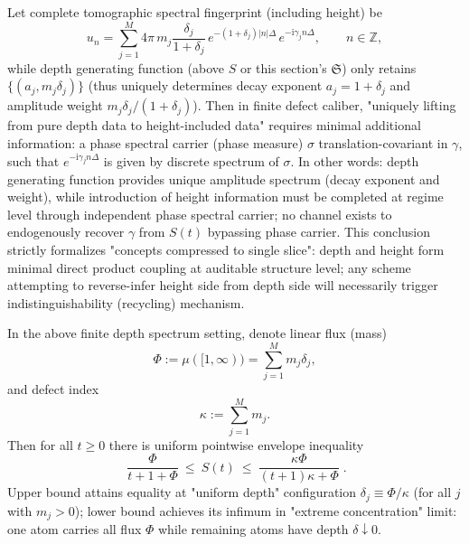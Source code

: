 \begin{proposition}\label{prop:xi-depth-height-minimal-coupling}
Let complete tomographic spectral fingerprint (including height) be
\[
u_n=\sum_{j=1}^{M}4\pi\,m_j\frac{\delta_j}{1+\delta_j}\,e^{-(1+\delta_j)|n|\Delta}\,e^{-\mathrm{i}\gamma_j n\Delta},
\qquad n\in\mathbb{Z},
\]
while depth generating function (above \(S\) or this section's \(\mathfrak{S}\)) only retains \(\{(a_j,m_j\delta_j)\}\) (thus uniquely determines decay exponent \(a_j=1+\delta_j\) and amplitude weight \(m_j\delta_j/(1+\delta_j)\)).
Then in finite defect caliber, "uniquely lifting from pure depth data to height-included data" requires minimal additional information: a phase spectral carrier (phase measure) \(\sigma\) translation-covariant in \(\gamma\), such that \(e^{-\mathrm{i}\gamma_j n\Delta}\) is given by discrete spectrum of \(\sigma\).
In other words: depth generating function provides unique amplitude spectrum (decay exponent and weight), while introduction of height information must be completed at regime level through independent phase spectral carrier; no channel exists to endogenously recover \(\gamma\) from \(S(t)\) bypassing phase carrier.
This conclusion strictly formalizes "concepts compressed to single slice": depth and height form minimal direct product coupling at auditable structure level; any scheme attempting to reverse-infer height side from depth side will necessarily trigger indistinguishability (recycling) mechanism.
\end{proposition}

\begin{proposition}
In the above finite depth spectrum setting, denote linear flux (mass)
\[
\Phi:=\mu([1,\infty))=\sum_{j=1}^{M}m_j\delta_j,
\]
and defect index
\[
\kappa:=\sum_{j=1}^{M}m_j.
\]
Then for all \(t\ge 0\) there is uniform pointwise envelope inequality
\[
\boxed{\;
\frac{\Phi}{t+1+\Phi}\ \le\ S(t)\ \le\ \frac{\kappa\Phi}{(t+1)\kappa+\Phi}\; }.
\]
Upper bound attains equality at "uniform depth" configuration \(\delta_j\equiv \Phi/\kappa\) (for all \(j\) with \(m_j>0\)); lower bound achieves its infimum in "extreme concentration" limit: one atom carries all flux \(\Phi\) while remaining atoms have depth \(\delta\downarrow 0\).
\end{proposition}

